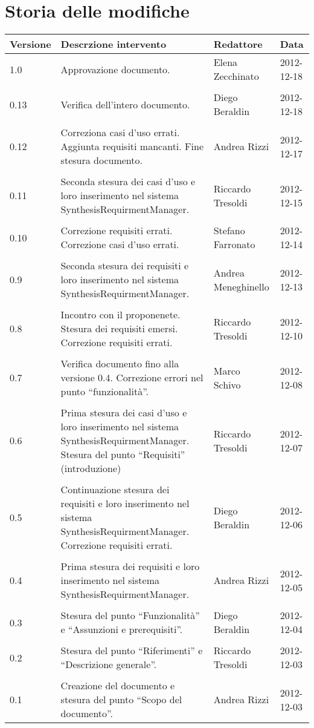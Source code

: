\section*{Storia delle modifiche}
\begin{tabularx}{\textwidth}{lXll}
\toprule
Versione & Descrzione intervento & Redattore & Data\\
\midrule %
1.0 & Approvazione documento. & Elena Zecchinato & 2012-12-18\\\\
0.13 & Verifica dell'intero documento. & Diego Beraldin & 2012-12-18\\\\
0.12 & Correziona casi d'uso errati. Aggiunta requisiti mancanti. Fine stesura documento. & Andrea Rizzi & 2012-12-17\\\\
0.11 & Seconda stesura dei casi d'uso e loro inserimento nel sistema SynthesisRequirmentManager. & Riccardo Tresoldi & 2012-12-15\\\\
0.10 & Correzione requisiti errati. Correzione casi d'uso errati. & Stefano Farronato & 2012-12-14\\\\
0.9 & Seconda stesura dei requisiti e loro inserimento nel sistema SynthesisRequirmentManager. & Andrea Meneghinello & 2012-12-13\\\\
0.8 & Incontro con il proponenete. Stesura dei requisiti emersi. Correzione requisiti errati. & Riccardo Tresoldi & 2012-12-10\\\\
0.7 & Verifica documento fino alla versione 0.4. Correzione errori nel punto ``funzionalità''. & Marco Schivo & 2012-12-08\\\\
0.6 & Prima stesura dei casi d'uso e loro inserimento nel sistema SynthesisRequirmentManager. Stesura del punto ``Requisiti'' (introduzione) & Riccardo Tresoldi & 2012-12-07\\\\
0.5 & Continuazione stesura dei requisiti e loro inserimento nel sistema SynthesisRequirmentManager. Correzione requisiti errati. & Diego Beraldin & 2012-12-06\\\\
0.4 & Prima stesura dei requisiti e loro inserimento nel sistema SynthesisRequirmentManager. & Andrea Rizzi & 2012-12-05\\\\
0.3 & Stesura del punto ``Funzionalità'' e ``Assunzioni e prerequisiti''. & Diego Beraldin & 2012-12-04\\\\
0.2 & Stesura del punto ``Riferimenti'' e ``Descrizione generale''. & Riccardo Tresoldi & 2012-12-03\\\\
0.1 & Creazione del documento e stesura del punto ``Scopo del documento''. & Andrea Rizzi & 2012-12-03\\
\bottomrule
\end{tabularx}
\newpage

